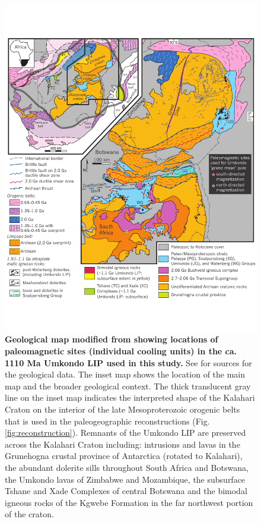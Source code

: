 \documentclass[11pt,letterpaper]{article}
\begin{document}
\begin{figure}[h!]
\includegraphics[width=5.7 in]{figures/Umkondo_locality_map.pdf}
\caption{\textbf{ Geological map modified from \cite{Hanson2011b} showing locations of paleomagnetic sites (individual cooling units) in the ca. 1110 Ma Umkondo LIP used in this study.} See \cite{Hanson2011b} for sources for the geological data. The inset map shows the location of the main map and the broader geological context. The thick translucent gray line on the inset map indicates the interpreted shape of the Kalahari Craton on the interior of the late Mesoproterozoic orogenic belts that is used in the paleogeographic reconstructions (Fig. \ref{fig:reconstruction}). Remnants of the Umkondo LIP are preserved across the Kalahari Craton including: intrusions and lavas in the Grunehogna crustal province of Antarctica (rotated to Kalahari), the abundant dolerite sills throughout South Africa and Botswana, the Umkondo lavas of Zimbabwe and Mozambique, the subsurface Tshane and Xade Complexes of central Botswana and the bimodal igneous rocks of the Kgwebe Formation in the far northwest portion of the craton.}
\label{fig:map}
\end{figure}
\end{document}
